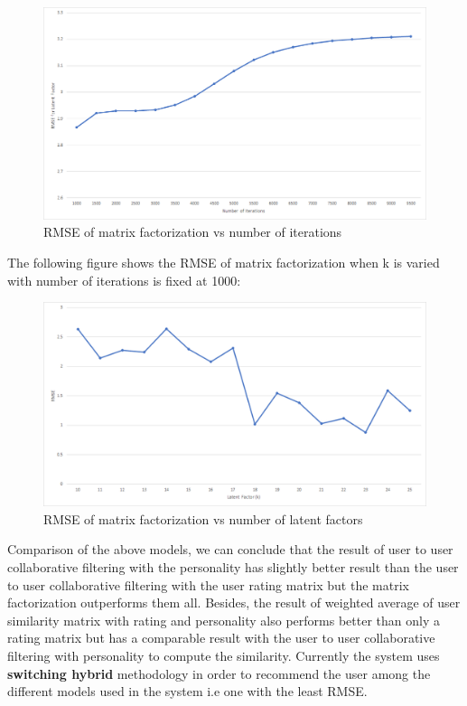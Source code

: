 \cleardoublepage

\begin{figure}[!ht]
\centering
\includegraphics[width = \textwidth ]{fig/rmse_step.png}
\caption{RMSE of matrix factorization vs number of iterations}
\label{fig:rmse_step}
\end{figure}

The following figure shows the RMSE of matrix factorization when k is varied with number of iterations is fixed at 1000:
\begin{figure}[!ht]
\centering
\includegraphics[width = \textwidth ]{fig/rmse_k.png}
\caption{RMSE of matrix factorization vs number of latent factors}
\label{fig:rmse_k}
\end{figure}

Comparison of the above models, we can conclude that the result of user to user collaborative filtering with the personality has slightly better result than the user to user collaborative filtering with the user rating matrix but the matrix factorization outperforms them all. Besides, the result of weighted average of user similarity matrix with rating and personality also performs better than only a rating matrix but has a comparable result with the user to user collaborative filtering with personality to compute the similarity. Currently the system uses \textbf{switching hybrid} methodology in order to recommend the user among the different models used in the system i.e one with the least RMSE.
